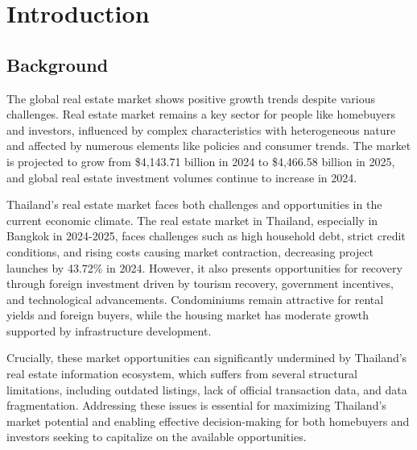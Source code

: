 
\chapter{Introduction}

\section{Background}

    The global real estate market shows positive growth trends despite various challenges.
Real estate market remains a key sector for people like homebuyers and investors,
influenced by complex characteristics with heterogeneous nature and affected by numerous elements like policies and consumer trends.
The market is projected to grow from \$4,143.71 billion in 2024 to \$4,466.58 billion in 2025, and global real estate investment volumes continue to increase in 2024\cite{JLL2025}.

Thailand's real estate market faces both challenges and opportunities in the current economic climate. The real estate market in Thailand,
especially in Bangkok in 2024-2025, faces challenges such as high household debt, strict credit conditions, and rising costs causing market contraction,
decreasing project launches by 43.72\% in 2024\cite{nationthailand1}. However, it also presents opportunities for recovery through foreign investment driven by tourism recovery,
government incentives, and technological advancements. Condominiums remain attractive for rental yields and foreign buyers, while the housing market has moderate growth supported by infrastructure development.


Crucially, these market opportunities can significantly undermined by Thailand's real estate information ecosystem, which suffers from several structural limitations, including outdated listings,
lack of official transaction data, and data fragmentation\cite{bangkokpost1}. Addressing these issues is essential for maximizing Thailand's market potential and enabling effective decision-making
for both homebuyers and investors seeking to capitalize on the available opportunities.

